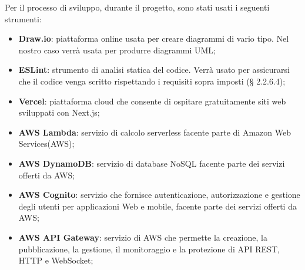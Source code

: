 Per il processo di sviluppo, durante il progetto, sono stati usati i seguenti strumenti:
\begin{itemize}
\item \textbf{Draw.io}: piattaforma online usata per creare diagrammi di vario tipo. Nel nostro caso verrà usata per produrre diagrammi UML;
\item \textbf{ESLint}: strumento di analisi statica del codice. Verrà usato per assicurarsi che il codice venga scritto rispettando i requisiti sopra imposti (§ 2.2.6.4);
\item \textbf{Vercel}: piattaforma cloud che consente di ospitare gratuitamente siti web sviluppati con Next.js;
\item \textbf{AWS Lambda}: servizio di calcolo serverless facente parte di Amazon Web Services(AWS);
\item \textbf{AWS DynamoDB}: servizio di database NoSQL facente parte dei servizi offerti da AWS;
\item \textbf{AWS Cognito}: servizio che fornisce autenticazione, autorizzazione e gestione degli utenti per applicazioni Web e mobile, facente parte dei servizi offerti da AWS;
\item \textbf{AWS API Gateway}: servizio di AWS che permette la creazione, la pubblicazione, la gestione, il monitoraggio e la protezione di API REST, HTTP e WebSocket;
\end{itemize} 